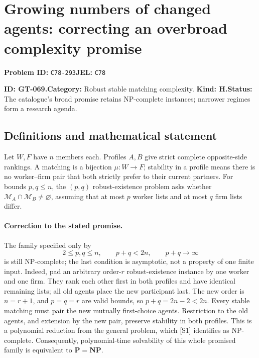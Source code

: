 \documentclass[11pt,a4paper]{article}
\begin{document}
\section*{Growing numbers of changed agents: correcting an overbroad complexity promise}
\textbf{Problem ID:} \texttt{C78-293}\quad \textbf{JEL:} \texttt{C78}\par
\label{problem:OP-0199}
\label{game:GT-069}
{\sffamily\small\color{muted}
\noindent\textbf{ID: GT-069.}\quad\textbf{Category:} Robust stable matching complexity.
\quad\textbf{Kind: H.}\quad\textbf{Status:} The catalogue's broad promise
retains NP-complete instances; narrower regimes form a research agenda.
\par}
\subsection*{Definitions and mathematical statement}
Let \(W,F\) have \(n\) members each. Profiles \(A,B\) give strict complete
opposite-side rankings. A matching is a bijection \(\mu:W\to F\);
stability in a profile means there is no worker--firm pair that both
strictly prefer to their current partners. For bounds \(p,q\leq n\),
the \((p,q)\) robust-existence problem asks whether
\(\mathcal M_A\cap\mathcal M_B\ne\varnothing\), assuming that at most
\(p\) worker lists and at most \(q\) firm lists differ.

\paragraph{Correction to the stated promise.}
The family specified only by
\[
 2\leq p,q\leq n,\qquad p+q<2n,\qquad p+q\longrightarrow\infty
\]
is still NP-complete; the last condition is asymptotic, not a property
of one finite input.
Indeed, pad an arbitrary order-\(r\) robust-existence instance by one
worker and one firm. They rank each other first in both profiles and
have identical remaining lists; all old agents place the new participant
last. The new order is \(n=r+1\), and \(p=q=r\) are valid bounds, so
\(p+q=2n-2<2n\).
Every stable matching must pair the new mutually first-choice agents.
Restriction to the old agents, and extension by the new pair, preserve
stability in both profiles. This is a polynomial reduction from the
general problem, which [S1] identifies as NP-complete.
Consequently, polynomial-time solvability of this whole promised family
is equivalent to \(\mathbf P=\mathbf{NP}\).
\end{document}
